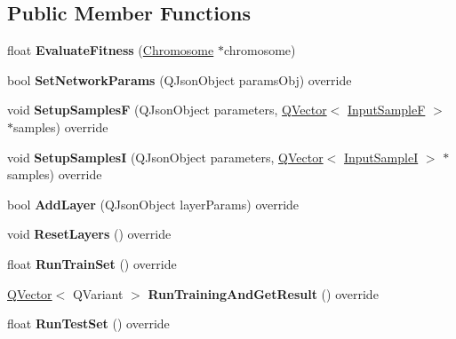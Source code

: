 \subsection*{Public Member Functions}
\begin{DoxyCompactItemize}
\item 
\mbox{\label{class_genetic_algorithm_adc2ff9ec8816b0979a3b3ac61e364518}} 
float {\bfseries Evaluate\+Fitness} (\hyperlink{class_chromosome}{Chromosome} $\ast$chromosome)
\item 
\mbox{\label{class_genetic_algorithm_a8013ce6b1043de624b679c2d109ed80d}} 
bool {\bfseries Set\+Network\+Params} (Q\+Json\+Object params\+Obj) override
\item 
\mbox{\label{class_genetic_algorithm_aa7e7cd7c3026f12e56f904106e90e8f0}} 
void {\bfseries Setup\+SamplesF} (Q\+Json\+Object parameters, \hyperlink{class_q_vector}{Q\+Vector}$<$ \hyperlink{class_q_pair}{Input\+SampleF} $>$ $\ast$samples) override
\item 
\mbox{\label{class_genetic_algorithm_a5d75f5d038e6a59dc45ac778d04b1979}} 
void {\bfseries Setup\+SamplesI} (Q\+Json\+Object parameters, \hyperlink{class_q_vector}{Q\+Vector}$<$ \hyperlink{class_q_pair}{Input\+SampleI} $>$ $\ast$samples) override
\item 
\mbox{\label{class_genetic_algorithm_a164e48b38c6f9113bd436cce18a93b65}} 
bool {\bfseries Add\+Layer} (Q\+Json\+Object layer\+Params) override
\item 
\mbox{\label{class_genetic_algorithm_af2ce8f9def4f4eddc7b8aa471705d8a6}} 
void {\bfseries Reset\+Layers} () override
\item 
\mbox{\label{class_genetic_algorithm_ad0cad1893056640d411928eb5184f199}} 
float {\bfseries Run\+Train\+Set} () override
\item 
\mbox{\label{class_genetic_algorithm_ac6b7a46cf3b71a79b4ae2612a2802607}} 
\hyperlink{class_q_vector}{Q\+Vector}$<$ Q\+Variant $>$ {\bfseries Run\+Training\+And\+Get\+Result} () override
\item 
\mbox{\label{class_genetic_algorithm_a6e56ca20f24e96e80007091f6a7d2acd}} 
float {\bfseries Run\+Test\+Set} () override
\end{DoxyCompactItemize}
